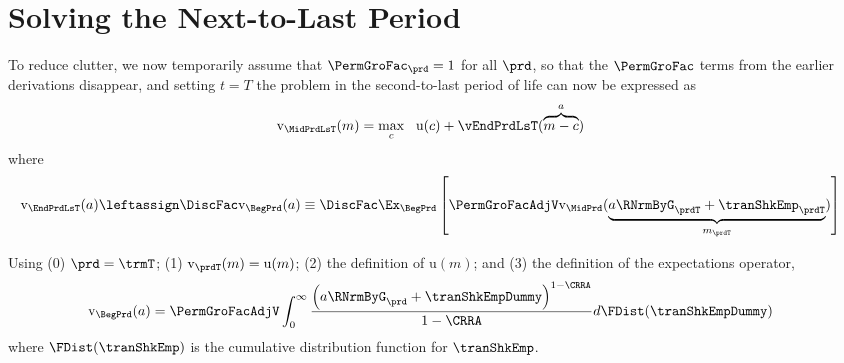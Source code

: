 \documentclass[titlepage, headings=optiontotocandhead]{econtex}
\begin{document}


\hypertarget{solving-the-next-to-last-period}{}
\hypertarget{solving-the-next}{}
\section{Solving the Next-to-Last Period}\label{sec:solving-the-next}

To reduce clutter, we now temporarily assume that $\PermGroFac_{\prd}=1$ for all $\prd$, so that the $\PermGroFac$ terms from the earlier derivations disappear, and setting $t=T$ the problem in the second-to-last period of life can now be expressed as
\begin{equation}\begin{gathered}\begin{aligned}
  \mathrm{v}_{\MidPrdLsT}(m)  & = \max_{c} ~~ \mathrm{u}(c) + \vEndPrdLsT(\overbrace{m-c}^{a})
                              \label{eq:vEndPrdTm1}
\end{aligned}\end{gathered}\end{equation}
where 
\begin{equation*}\begin{gathered}\begin{aligned}
  \mathrm{v}_{\EndPrdLsT}(a)  & \leftassign \DiscFac \mathrm{v}_{\BegPrd}(a) 
                           \equiv \DiscFac \Ex_{\BegPrd} \left[\PermGroFacAdjV \mathrm{v}_{\MidPrd}(\underbrace{a \RNrmByG_{\prdT} + \tranShkEmp_{\prdT}}_{{m}_{\prdT}})\right]
    \end{aligned}\end{gathered}\end{equation*}



Using (0) $\prd=\trmT$; (1) $\mathrm{v}_{\prdT}(m)=\mathrm{u}(m)$; (2) the definition of $\mathrm{u}(m)$; and (3) the definition of the expectations operator,  %
\begin{equation}\begin{gathered}\begin{aligned}
      \mathrm{v}_{\BegPrd}(a)   & = \PermGroFacAdjV\int_{0}^{\infty} \frac{\left(a \RNrmByG_{\prd}+ \tranShkEmpDummy\right)^{1-\CRRA}}{1-\CRRA}  d\FDist(\tranShkEmpDummy) \label{eq:NumDefInt}
    \end{aligned}\end{gathered}\end{equation}
where $\FDist(\tranShkEmp)$ is the cumulative distribution function for ${\tranShkEmp}$.
\end{document}
